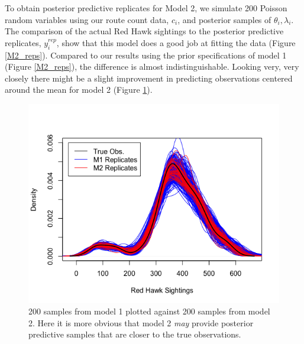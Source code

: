\documentclass{asaproc}
\newcommand{\lami}{\lambda_i}
\newcommand{\theti}{\theta_i}
\newcommand{\ci}{c_i}
\begin{document}
To obtain posterior predictive replicates for Model 2, we simulate 200 Poisson random variables using our route count data, $\ci$, and posterior samples of $\theti, \lami$. The comparison of the actual Red Hawk sightings to the posterior  predictive  replicates, $y_i^{rep}$, show that this model does a good job at fitting the data (Figure \ref{M2_reps}).
Compared to our results using the prior specifications of model 1 (Figure \ref{M2_reps}), the difference is almost indistinguishable. Looking very, very closely there might be a slight improvement in predicting observations centered around the mean for model 2 (Figure \ref{compare}).

\begin{figure}[h!]
    \centering
    \includegraphics[scale=0.35]{comparison.png}
    \caption{200 samples from model 1 plotted against 200 samples from model 2. Here it is more obvious that model 2 \textit{may} provide posterior predictive samples that are closer to the true observations.}
    \label{compare}
\end{figure}
\end{document}
